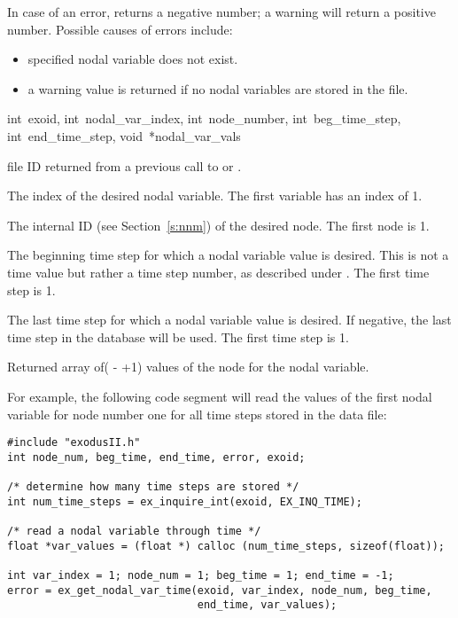 In case of an error,  returns a
negative number; a warning will return a positive number. Possible
causes of errors include:

\begin{itemize}
 \item specified nodal variable does not exist.

 \item a warning value is returned if no nodal variables are stored in
 the file.
\end{itemize}

{int~exoid, 
int~nodal_var_index, 
int~node_number,
int~beg_time_step, 
int~end_time_step, 
void~*nodal_var_vals}

\begin{parameters}
\item[{int exoid \R{}}]
\exo{} file ID returned from a previous call to  or
.

\item[{int nodal_var_index \R{}}]
The index of the desired nodal variable. The first variable has an
index of 1.

\item[{int node_number \R{}}]
The internal ID (see  Section~\ref{s:nnm}) of the desired 
node. The first node is 1.

\item[{int beg_time_step \R{}}]
The beginning time step for which a nodal variable value 
is desired. This is not a time value but rather a time step number, 
as described under . The first time step 
is 1.

\item[{int end_time_step \R{}}]
The last time step for which a nodal variable value is desired. If
negative, the last time step in the database will be used. The first
time step is 1.

\item[{void* nodal_var_vals \W{}}]
Returned array of( {-}  +1) values
of the \th{} node for the \th{} nodal
variable.
\end{parameters}

For example, the following code segment will read the values 
of the first nodal variable for node number one for all time 
steps stored in the data file:
\begin{lstlisting}
#include "exodusII.h"
int node_num, beg_time, end_time, error, exoid;

/* determine how many time steps are stored */
int num_time_steps = ex_inquire_int(exoid, EX_INQ_TIME);

/* read a nodal variable through time */
float *var_values = (float *) calloc (num_time_steps, sizeof(float));

int var_index = 1; node_num = 1; beg_time = 1; end_time = -1;
error = ex_get_nodal_var_time(exoid, var_index, node_num, beg_time,
                              end_time, var_values);

\end{lstlisting}

